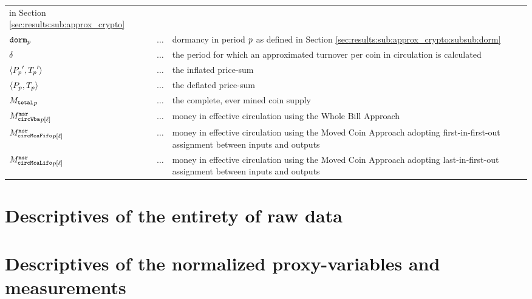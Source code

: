 \begin{landscape}
\begin{table}[ht]
\begin{tabular}{lll}
                                          in Section \ref{sec:results:sub:approx_crypto}\\%
      $\mathtt{dorm}_{p}$                  & $\hdots{}$ &  dormancy in period \({p}\) as defined in
                                          Section \ref{sec:results:sub:approx_crypto:subsub:dorm}\\%
      $\delta$                  & $\hdots{}$ &  the period for which an approximated turnover per coin in circulation is calculated\\%
      $\langle{P_{p}}',{T_{p}}'\rangle$ & $\hdots{}$ &  the inflated price-sum \\%
      $\langle{P_{p}} ,{T_{p}}\rangle$  & $\hdots{}$ &  the deflated price-sum \\%
      ${{M_{\mathtt{total}}}_{p}}$                & $\hdots{}$ &  the complete, ever mined coin supply\\%
      ${{M_{\mathtt{circWba}}^{\mathtt{msr}}}_{{p}[{\ell}]}}$          & $\hdots{}$ &  money in effective circulation using the Whole Bill Approach\\%
      ${{M_{\mathtt{circMcaFifo}}^{\mathtt{msr}}}_{{p}[{\ell}]}}$          & $\hdots{}$ &  money in effective circulation using the Moved Coin Approach
                                          adopting first-in-first-out assignment between inputs and outputs\\%
      ${{M_{\mathtt{circMcaLifo}}^{\mathtt{msr}}}_{{p}[{\ell}]}}$          & $\hdots{}$ &  money in effective circulation using the Moved Coin Approach
                                          adopting last-in-first-out assignment between inputs and outputs%
    \end{tabular}%
  \end{table}%
  \capstarttrue
\end{landscape}%

\addtolength{\textwidth}{-20pt}
%
\newpage{}%
%
\section{Descriptives of the entirety of raw data}\label{sec:descr-entir-raw}
\addtolength{\tabcolsep}{-2pt}  
\renewcommand{\captionGlo} {Basic descriptive statistics based on Bitcoin data from 01.06.2013 to 01.06.2019 with $\perd = \wndwLength = 1 \ttext{ day} $. Variables marked by "$^{\ast}$" are scaled down by factor 1,000,000.}%
\renewcommand{\labelGlo}   {\label{tbl:appendix_desc_other}}%
\addtolength{\tabcolsep}{+2pt}

\section{Descriptives of the normalized proxy-variables and measurements}\label{sec:descr-norm-proxy}
\addtolength{\tabcolsep}{-2pt}  
\renewcommand{\captionGlo} {Basic descriptive statistics based on normalized velocity measurement and approximation data from 01.06.2013 to 01.06.2019 with $\perd = \wndwLength = 1 \ttext{ day} $.}%
\renewcommand{\labelGlo}   {\label{tbl:appendix_desc_other_norm}}%
\addtolength{\tabcolsep}{+2pt}

